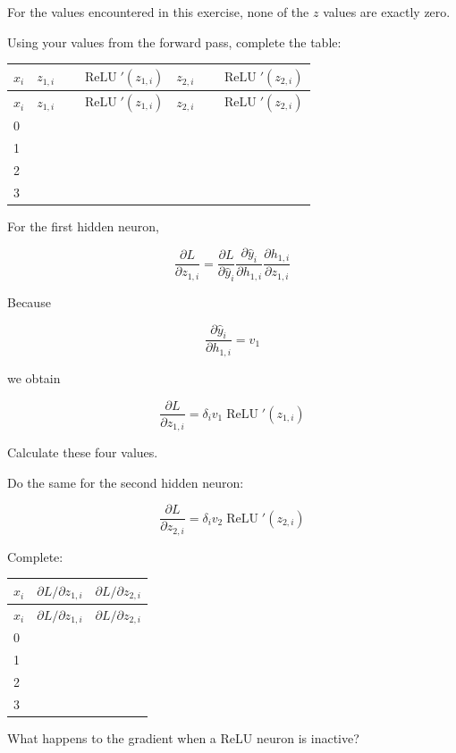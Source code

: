 \documentclass[10pt]{article}
\begin{document}
For the values encountered in this exercise, none of the $z$ values are exactly zero.

Using your values from the forward pass, complete the table:

\begingroup
\small
\setlength{\tabcolsep}{4pt}
\begin{longtable}{l|l|l|l|l}
$x_i$ & $z_{1,i}$ & $\operatorname{ReLU}'(z_{1,i})$ & $z_{2,i}$ & $\operatorname{ReLU}'(z_{2,i})$ \\[1.5pt]
\hline
\endfirsthead
$x_i$ & $z_{1,i}$ & $\operatorname{ReLU}'(z_{1,i})$ & $z_{2,i}$ & $\operatorname{ReLU}'(z_{2,i})$ \\[1.5pt]
\hline
\endhead
\rule{0pt}{2.4ex}0 &  $\phantom{-0.00}$ &  $\phantom{-0.00}$ &  $\phantom{-0.00}$ &  $\phantom{-0.00}$ \\[3pt]
\rule{0pt}{2.4ex}1 &  $\phantom{-0.00}$ &  $\phantom{-0.00}$ &  $\phantom{-0.00}$ &  $\phantom{-0.00}$ \\[3pt]
\rule{0pt}{2.4ex}2 &  $\phantom{-0.00}$ &  $\phantom{-0.00}$ &  $\phantom{-0.00}$ &  $\phantom{-0.00}$ \\[3pt]
\rule{0pt}{2.4ex}3 &  $\phantom{-0.00}$ &  $\phantom{-0.00}$ &  $\phantom{-0.00}$ &  $\phantom{-0.00}$ \\[3pt]
\end{longtable}
\endgroup
For the first hidden neuron,

\[
\frac{\partial L}{\partial z_{1,i}}=\frac{\partial L}{\partial\hat y_i}\frac{\partial\hat y_i}{\partial h_{1,i}}\frac{\partial h_{1,i}}{\partial z_{1,i}}
\]

Because

\[
\frac{\partial\hat y_i}{\partial h_{1,i}}=v_1
\]

we obtain

\[
\frac{\partial L}{\partial z_{1,i}}=\delta_i v_1\operatorname{ReLU}'(z_{1,i})
\]

Calculate these four values.

Do the same for the second hidden neuron:

\[
\frac{\partial L}{\partial z_{2,i}}=\delta_i v_2\operatorname{ReLU}'(z_{2,i})
\]

Complete:

\begingroup
\small
\setlength{\tabcolsep}{4pt}
\begin{longtable}{l|l|l}
$x_i$ & $\partial L/\partial z_{1,i}$ & $\partial L/\partial z_{2,i}$ \\[1.5pt]
\hline
\endfirsthead
$x_i$ & $\partial L/\partial z_{1,i}$ & $\partial L/\partial z_{2,i}$ \\[1.5pt]
\hline
\endhead
\rule{0pt}{2.4ex}0 &  $\phantom{-0.00}$ &  $\phantom{-0.00}$ \\[3pt]
\rule{0pt}{2.4ex}1 &  $\phantom{-0.00}$ &  $\phantom{-0.00}$ \\[3pt]
\rule{0pt}{2.4ex}2 &  $\phantom{-0.00}$ &  $\phantom{-0.00}$ \\[3pt]
\rule{0pt}{2.4ex}3 &  $\phantom{-0.00}$ &  $\phantom{-0.00}$ \\[3pt]
\end{longtable}
\endgroup
What happens to the gradient when a ReLU neuron is inactive?
\end{document}
